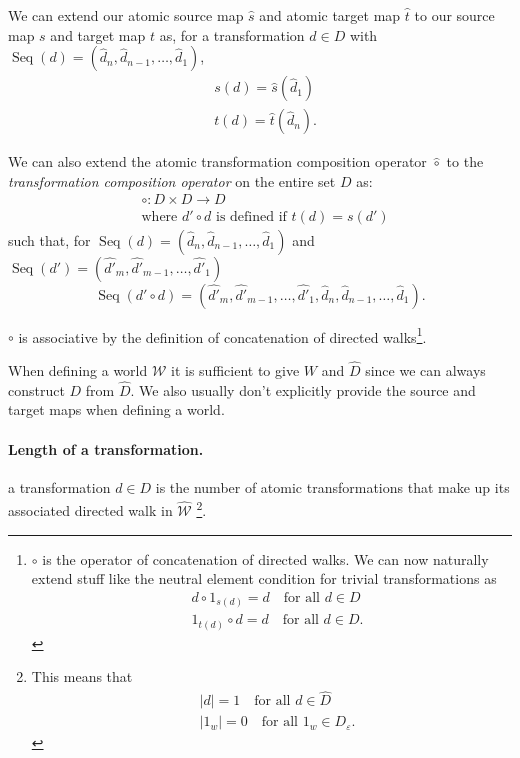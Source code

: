 We can extend our atomic source map $\hat{s}$ and atomic target map $\hat{t}$ to our source map $s$ and target map $t$ as, for a transformation $d \in D$ with $\operatorname{Seq}(d) = (\hat{d}_{n}, \hat{d}_{n-1}, \dots, \hat{d}_{1})$,
\begin{align}
	& s(d) = \hat{s}(\hat{d}_{1}) \\
	& t(d) = \hat{t}(\hat{d}_{n}).
\end{align}

We can also extend the atomic transformation composition operator $\hat{\circ}$ to the \emph{transformation composition operator} on the entire set $D$ as:
\begin{equation}
\begin{aligned}
	& \circ: D \times D \to D \\
	& \text{where $d' \circ d$ is defined if $t(d) = s(d')$}
\end{aligned}
\end{equation}
such that, for $\operatorname{Seq}(d) = (\hat{d}_{n}, \hat{d}_{n-1}, \dots, \hat{d}_{1})$ and $\operatorname{Seq}(d') = (\hat{d'}_{m}, \hat{d'}_{m-1}, \dots, \hat{d'}_{1})$
\begin{equation}
	\operatorname{Seq}(d' \circ d) = (\hat{d'}_{m}, \hat{d'}_{m-1}, \dots, \hat{d'}_{1}, \hat{d}_{n}, \hat{d}_{n-1}, \dots, \hat{d}_{1}).
\end{equation}

\begin{corollaryE}
    $\circ$ is associative by the definition of concatenation of directed walks\footnote{
        $\circ$ is the operator of concatenation of directed walks.
        We can now naturally extend stuff like the neutral element condition for trivial transformations as
        \begin{align}
            & d \circ 1_{s(d)} = d \quad \text{for all $d \in D$} \\
            & 1_{t(d)} \circ d = d \quad \text{for all $d \in D$}.
        \end{align}
    }.
\end{corollaryE}


\begin{notation}
	When defining a world $\mathscr{W}$ it is sufficient to give $W$ and $\hat{D}$ since we can always construct $D$ from $\hat{D}$.
	We also usually don't explicitly provide the source and target maps when defining a world.
\end{notation}


\paragraph{Length of a transformation.}
 a transformation $d \in D$ is the number of atomic transformations that make up its associated directed walk in $\hat{\mathscr{W}}$ \footnote{
    This means that
    \begin{align}
        & |d| = 1 \quad \text{for all $d \in \hat{D}$} \\
        & |1_{w}| = 0 \quad \text{for all $1_{w} \in D_{\varepsilon}$}.
    \end{align}
}.

